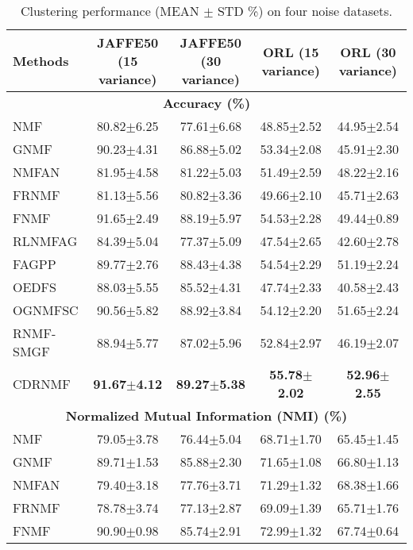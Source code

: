 \documentclass[a4paper,fleqn]{cas-sc}
\begin{document}
\begin{table}[ht]
	\centering
	\caption{Clustering performance (MEAN $\pm$ STD \%) on four noise datasets.}
	{\footnotesize
	\begin{tabular}{lcccc}
		\toprule
		\textbf{Methods} & \textbf{JAFFE50 (15 variance)} & \textbf{JAFFE50 (30 variance)} & \textbf{ORL (15 variance)} & \textbf{ORL (30 variance)} \\
		\midrule
		\multicolumn{5}{c}{\textbf{Accuracy (\%)}} \\
		\midrule
		NMF & 80.82$\pm$6.25 & 77.61$\pm$6.68 & 48.85$\pm$2.52 & 44.95$\pm$2.54 \\
		GNMF & 90.23$\pm$4.31 & 86.88$\pm$5.02 & 53.34$\pm$2.08 & 45.91$\pm$2.30 \\
		NMFAN & 81.95$\pm$4.58 & 81.22$\pm$5.03 & 51.49$\pm$2.59 & 48.22$\pm$2.16 \\
		FRNMF & 81.13$\pm$5.56 & 80.82$\pm$3.36 & 49.66$\pm$2.10 & 45.71$\pm$2.63 \\
		FNMF & 91.65$\pm$2.49 & 88.19$\pm$5.97 & 54.53$\pm$2.28 & 49.44$\pm$0.89 \\
		RLNMFAG & 84.39$\pm$5.04 & 77.37$\pm$5.09 & 47.54$\pm$2.65 & 42.60$\pm$2.78 \\
		FAGPP & 89.77$\pm$2.76 & 88.43$\pm$4.38 & 54.54$\pm$2.29 & 51.19$\pm$2.24 \\
		OEDFS & 88.03$\pm$5.55 & 85.52$\pm$4.31 & 47.74$\pm$2.33 & 40.58$\pm$2.43 \\
		OGNMFSC & 90.56$\pm$5.82 & 88.92$\pm$3.84 & 54.12$\pm$2.20 & 51.65$\pm$2.24 \\
		RNMF-SMGF & 88.94$\pm$5.77 & 87.02$\pm$5.96 & 52.84$\pm$2.97 & 46.19$\pm$2.07 \\
		CDRNMF & \textbf{91.67$\pm$4.12} & \textbf{89.27$\pm$5.38} & \textbf{55.78$\pm$2.02} & \textbf{52.96$\pm$2.55} \\
		\midrule
		\multicolumn{5}{c}{\textbf{Normalized Mutual Information (NMI) (\%)}} \\
		\midrule
		NMF & 79.05$\pm$3.78 & 76.44$\pm$5.04 & 68.71$\pm$1.70 & 65.45$\pm$1.45 \\
		GNMF & 89.71$\pm$1.53 & 85.88$\pm$2.30 & 71.65$\pm$1.08 & 66.80$\pm$1.13 \\
		NMFAN & 79.40$\pm$3.18 & 77.76$\pm$3.71 & 71.29$\pm$1.32 & 68.38$\pm$1.66 \\
		FRNMF & 78.78$\pm$3.74 & 77.13$\pm$2.87 & 69.09$\pm$1.39 & 65.71$\pm$1.76 \\
		FNMF & 90.90$\pm$0.98 & 85.74$\pm$2.91 & 72.99$\pm$1.32 & 67.74$\pm$0.64 \\

\end{tabular}}
\end{table}
\end{document}
